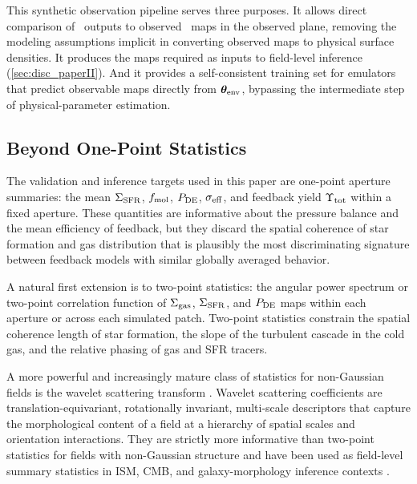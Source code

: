This synthetic observation pipeline serves three purposes. It allows
direct comparison of \TIGRESS\ outputs to observed \PHANGS\ maps in the
observed plane, removing the modeling assumptions implicit in
converting observed maps to physical surface densities. It produces the
maps required as inputs to field-level inference (\autoref{sec:disc_paperII}).
And it provides a self-consistent training set for emulators that
predict observable maps directly from $\boldsymbol{\theta}_{\rm env}$, bypassing the
intermediate step of physical-parameter estimation.

\subsection{Beyond One-Point Statistics}
\label{sec:disc_twopoint}

The validation and inference targets used in this paper are one-point
aperture summaries: the mean $\Sigma_{\rm SFR}$, $f_{\rm mol}$, $P_{\rm DE}$, $\sigma_{\rm eff}$, and
feedback yield $\Upsilon_{\rm tot}$ within a fixed aperture. These quantities are
informative about the pressure balance and the mean efficiency of
feedback, but they discard the spatial coherence of star formation and
gas distribution that is plausibly the most discriminating signature
between feedback models with similar globally averaged behavior.

A natural first extension is to two-point statistics: the angular power
spectrum or two-point correlation function of $\Sigma_{\rm gas}$, $\Sigma_{\rm SFR}$, and
$P_{\rm DE}$ maps within each aperture or across each simulated patch.
Two-point statistics constrain the spatial coherence length of star
formation, the slope of the turbulent cascade in the cold gas, and the
relative phasing of gas and SFR tracers. 

A more powerful and increasingly mature class of statistics for
non-Gaussian fields is the wavelet scattering transform
\citep{CITATION_NEEDED_TBD}. Wavelet scattering coefficients are
translation-equivariant, rotationally invariant, multi-scale
descriptors that capture the morphological content of a field at a
hierarchy of spatial scales and orientation interactions. They are
strictly more informative than two-point statistics for fields with
non-Gaussian structure and have been used as field-level summary
statistics in ISM, CMB, and galaxy-morphology inference contexts
\citep{CITATION_NEEDED_TBD}. 

